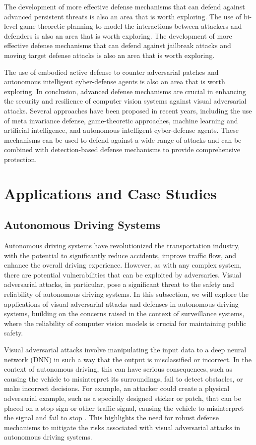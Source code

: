 \documentclass[11pt]{article}
\begin{document}
The development of more effective defense mechanisms that can defend against advanced persistent threats \cite{ref103} is also an area that is worth exploring. The use of bi-level game-theoretic planning to model the interactions between attackers and defenders \cite{ref104} is also an area that is worth exploring. The development of more effective defense mechanisms that can defend against jailbreak attacks \cite{ref105} and moving target defense attacks \cite{ref107} is also an area that is worth exploring.

The use of embodied active defense to counter adversarial patches \cite{ref106} and autonomous intelligent cyber-defense agents \cite{ref108} is also an area that is worth exploring. In conclusion, advanced defense mechanisms are crucial in enhancing the security and resilience of computer vision systems against visual adversarial attacks. Several approaches have been proposed in recent years, including the use of meta invariance defense, game-theoretic approaches, machine learning and artificial intelligence, and autonomous intelligent cyber-defense agents. These mechanisms can be used to defend against a wide range of attacks and can be combined with detection-based defense mechanisms to provide comprehensive protection.

\section{Applications and Case Studies}

\subsection{Autonomous Driving Systems}

Autonomous driving systems have revolutionized the transportation industry, with the potential to significantly reduce accidents, improve traffic flow, and enhance the overall driving experience. However, as with any complex system, there are potential vulnerabilities that can be exploited by adversaries. Visual adversarial attacks, in particular, pose a significant threat to the safety and reliability of autonomous driving systems. In this subsection, we will explore the applications of visual adversarial attacks and defenses in autonomous driving systems, building on the concerns raised in the context of surveillance systems, where the reliability of computer vision models is crucial for maintaining public safety.

Visual adversarial attacks involve manipulating the input data to a deep neural network (DNN) in such a way that the output is misclassified or incorrect. In the context of autonomous driving, this can have serious consequences, such as causing the vehicle to misinterpret its surroundings, fail to detect obstacles, or make incorrect decisions. For example, an attacker could create a physical adversarial example, such as a specially designed sticker or patch, that can be placed on a stop sign or other traffic signal, causing the vehicle to misinterpret the signal and fail to stop \cite{ref109}. This highlights the need for robust defense mechanisms to mitigate the risks associated with visual adversarial attacks in autonomous driving systems.
\end{document}
